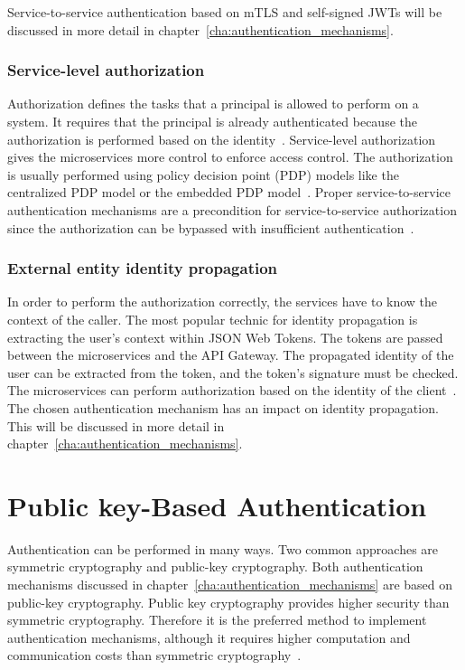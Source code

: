Service-to-service authentication based on mTLS and self-signed JWTs will be discussed in more detail in chapter~\ref{cha:authentication_mechanisms}.

\subsubsection{Service-level authorization} 
\label{sec:service-level-authorization}
Authorization defines the tasks that a principal is allowed to perform on a system.
It requires that the principal is already authenticated because the authorization is performed based on the identity~\cite{siriwardena2014advanced}. 
Service-level authorization gives the microservices more control to enforce access control.
The authorization is usually performed using policy decision point (PDP) models like the centralized PDP model or the embedded PDP model~\cite{dias2020microservices, barabanov2020authentication}.
Proper service-to-service authentication mechanisms are a precondition for service-to-service authorization since the authorization can be bypassed with insufficient authentication~\cite{siriwardena2014advanced}.

\subsubsection{External entity identity propagation} 
\label{sec:external-entity-identity-propagation}
In order to perform the authorization correctly, the services have to know the context of the caller.
The most popular technic for identity propagation is extracting the user's context within JSON Web Tokens.
The tokens are passed between the microservices and the API Gateway.
The propagated identity of the user can be extracted from the token, and the token's signature must be checked.
The microservices can perform authorization based on the identity of the client~\cite{barabanov2020authentication, dias2020microservices}.
The chosen authentication mechanism has an impact on identity propagation. This will be discussed in more detail in chapter~\ref{cha:authentication_mechanisms}.

\section{Public key-Based Authentication}
Authentication can be performed in many ways. Two common approaches are symmetric cryptography and public-key cryptography.
Both authentication mechanisms discussed in chapter~\ref{cha:authentication_mechanisms} are based on public-key cryptography.
Public key cryptography provides higher security than symmetric cryptography.
Therefore it is the preferred method to implement authentication mechanisms, although it requires higher computation and communication costs than symmetric cryptography~\cite{pubkeycrypto}.

